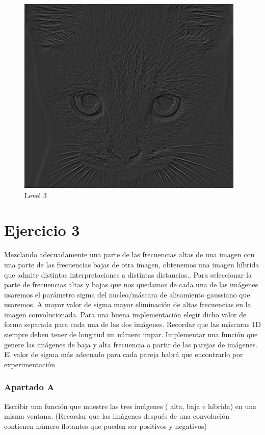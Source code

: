 \documentclass{article}
\begin{document}
\begin{figure}[H]
\centering
\includegraphics[scale=1]{Ejercicio2e/cat4.png}
\caption{Level 3}
\end{figure}



\section*{Ejercicio 3}
Mezclando adecuadamente una parte de las frecuencias altas de una imagen con una parte de las frecuencias bajas de otra imagen, obtenemos una imagen híbrida que admite distintas interpretaciones a distintas distancias..
Para seleccionar la parte de frecuencias altas y bajas que nos quedamos de cada una de las imágenes usaremos el parámetro sigma del nucleo/máscara de alisamiento gaussiano que usaremos. A mayor valor de sigma mayor eliminación de altas frecuencias en la imagen convolucionada. Para una buena implementación elegir dicho valor de forma separada para cada una de las dos imágenes. Recordar que las máscaras 1D siempre deben tener de longitud un número impar.
Implementar una función que genere las imágenes de baja y alta frecuencia a partir de las parejas de imágenes. El valor de sigma más adecuado para cada pareja habrá que encontrarlo por experimentación
\subsubsection{Apartado A} Escribir una función que muestre las tres imágenes ( alta, baja e híbrida) en una misma ventana. (Recordar que las imágenes después de una convolución contienen número flotantes que pueden ser positivos y negativos)
\end{document}

